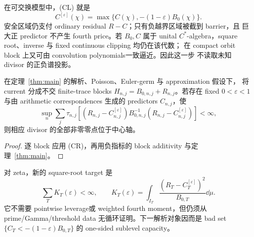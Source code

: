 在可交换模型中，(CL) 就是
\[
 C^{[\varepsilon]}(\chi)
 =\max\{C(\chi),-(1-\varepsilon)B_0(\chi)\}.      \tag{SC}
\]
安全区域仍支付 ordinary residual $R-C$；只有负越界区域被截到 barrier，且
巨大正 predictor 不产生 fourth price。若 $B_0,C$ 属于 unital
$C^*$-algebra，square root、inverse 与 fixed continuous clipping 均仍在该代数；
在 compact orbit block 上又可由 convolution polynomials一致逼近。因此这一步
不读取未知 divisor 的正负谱投影。

\begin{theorem}
\label{thm:clipped-weil}
在定理~\ref{thm:main} 的解析、Poisson、Euler-germ 与 approximation 假设下，
将 current 分成不交 finite-trace blocks
$H_{n,j}=B_{0,n,j}+R_{n,j}$。若存在 fixed $0<\varepsilon<1$ 与由 arithmetic
correspondences 生成的 predictors $C_{n,j}$，使
\[
 \sup_n\sum_j\tau_{n,j}\!\left[
 (R_{n,j}-C_{n,j}^{[\varepsilon]})B_{0,n,j}^{-1}
 (R_{n,j}-C_{n,j}^{[\varepsilon]})\right]<\infty, \tag{CW}
\]
则相应 divisor 的全部非零零点位于中心轴。
\end{theorem}

\begin{proof}
逐 block 应用 (CR)，再用负指标的 block additivity 与定理~\ref{thm:main}。
\end{proof}

对 zeta，新的 square-root target 是
\[
 \sum_TK_T(\varepsilon)<\infty,\qquad
 K_T(\varepsilon)=\int_{I_T}
 \frac{(R_T-C_T^{[\varepsilon]})^2}{B_{0,T}}\dd\mu. \tag{CT}
\]
它不需要 pointwise leverage或 weighted fourth moment，但仍须从
prime/Gamma/threshold data 无循环证明。下一解析对象因而是 bad set
$\{C_T<-(1-\varepsilon)B_{0,T}\}$ 的 one-sided sublevel capacity。
